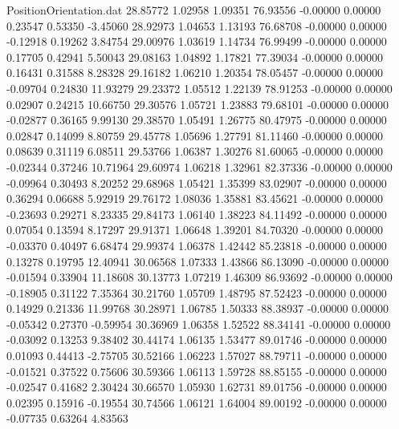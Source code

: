 \begin{filecontents}{PositionOrientation.dat}
  28.85772    1.02958    1.09351    76.93556   -0.00000    0.00000    0.23547    0.53350   -3.45060
  28.92973    1.04653    1.13193    76.68708   -0.00000    0.00000   -0.12918    0.19262    3.84754
  29.00976    1.03619    1.14734    76.99499   -0.00000    0.00000    0.17705    0.42941    5.50043
  29.08163    1.04892    1.17821    77.39034   -0.00000    0.00000    0.16431    0.31588    8.28328
  29.16182    1.06210    1.20354    78.05457   -0.00000    0.00000   -0.09704    0.24830   11.93279
  29.23372    1.05512    1.22139    78.91253   -0.00000    0.00000    0.02907    0.24215   10.66750
  29.30576    1.05721    1.23883    79.68101   -0.00000    0.00000   -0.02877    0.36165    9.99130
  29.38570    1.05491    1.26775    80.47975   -0.00000    0.00000    0.02847    0.14099    8.80759
  29.45778    1.05696    1.27791    81.11460   -0.00000    0.00000    0.08639    0.31119    6.08511
  29.53766    1.06387    1.30276    81.60065   -0.00000    0.00000   -0.02344    0.37246   10.71964
  29.60974    1.06218    1.32961    82.37336   -0.00000    0.00000   -0.09964    0.30493    8.20252
  29.68968    1.05421    1.35399    83.02907   -0.00000    0.00000    0.36294    0.06688    5.92919
  29.76172    1.08036    1.35881    83.45621   -0.00000    0.00000   -0.23693    0.29271    8.23335
  29.84173    1.06140    1.38223    84.11492   -0.00000    0.00000    0.07054    0.13594    8.17297
  29.91371    1.06648    1.39201    84.70320   -0.00000    0.00000   -0.03370    0.40497    6.68474
  29.99374    1.06378    1.42442    85.23818   -0.00000    0.00000    0.13278    0.19795   12.40941
  30.06568    1.07333    1.43866    86.13090   -0.00000    0.00000   -0.01594    0.33904   11.18608
  30.13773    1.07219    1.46309    86.93692   -0.00000    0.00000   -0.18905    0.31122    7.35364
  30.21760    1.05709    1.48795    87.52423   -0.00000    0.00000    0.14929    0.21336   11.99768
  30.28971    1.06785    1.50333    88.38937   -0.00000    0.00000   -0.05342    0.27370   -0.59954
  30.36969    1.06358    1.52522    88.34141   -0.00000    0.00000   -0.03092    0.13253    9.38402
  30.44174    1.06135    1.53477    89.01746   -0.00000    0.00000    0.01093    0.44413   -2.75705
  30.52166    1.06223    1.57027    88.79711   -0.00000    0.00000   -0.01521    0.37522    0.75606
  30.59366    1.06113    1.59728    88.85155   -0.00000    0.00000   -0.02547    0.41682    2.30424
  30.66570    1.05930    1.62731    89.01756   -0.00000    0.00000    0.02395    0.15916   -0.19554
  30.74566    1.06121    1.64004    89.00192   -0.00000    0.00000   -0.07735    0.63264    4.83563

\end{filecontents}
